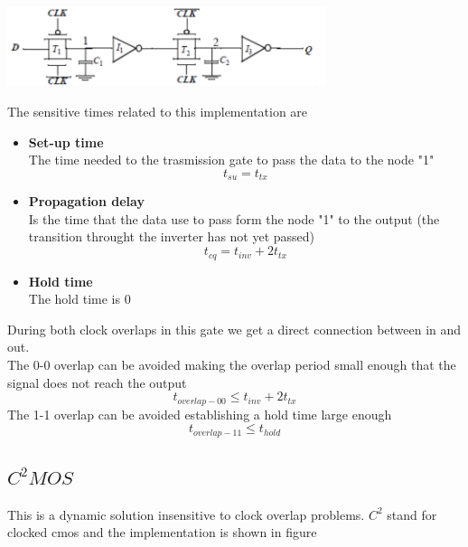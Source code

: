 \vspace{2mm}
\centering
\includegraphics[width=0.7\textwidth]{C10_15.png}\\
\raggedright
\vspace{2mm}

The sensitive times related to this implementation are
\begin{itemize}
\item 
{\bf Set-up time}\\
The time needed to the trasmission gate to pass the data to the node "1"
\begin{equation}
t_{su}=t_{tx}
\end{equation}

\item 
{\bf Propagation delay}\\
Is the time that the data use to pass form the node "1" to the output (the transition throught the inverter has not yet passed)
\begin{equation}
t_{cq}=t_{inv}+2t_{tx}
\end{equation}

\item
{\bf Hold time}\\
The hold time is 0

\end{itemize}
\vspace{5mm}
During both clock overlaps in this gate we get a direct connection between in and out.\\
The 0-0 overlap can be avoided making the overlap period small enough that the signal does not reach the output 
\begin{equation}
t_{overlap-00}\le t_{inv}+2t_{tx}
\end{equation} 
The 1-1 overlap can be avoided establishing a hold time large enough 
\begin{equation}
t_{overlap-11}\le t_{hold}
\end{equation}

\subsection{$C^2 MOS$}
This is a dynamic solution insensitive to clock overlap problems. $C^2$ stand for clocked cmos and the implementation is shown in figure 

